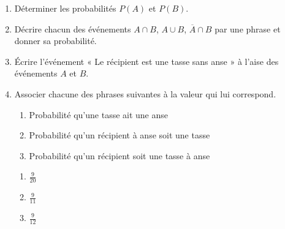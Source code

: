 \documentclass[11pt]{article}
\begin{document}
\begin{enumerate}
  \item Déterminer les probabilités $P(A)$ et $P(B)$.
  \item Décrire chacun des événements $A\cap B$, $A\cup B$, $\overline A\cap B$
    par une phrase et donner sa probabilité.
  \item Écrire l'événement « Le récipient est une tasse sans anse » à l'aise des
    événements $A$ et $B$.
  \item Associer chacune des phrases suivantes à la valeur qui lui correspond.\\
    \begin{minipage}[]{.6\textwidth}
      \begin{center}
        \begin{enumerate}
          \item Probabilité qu'une tasse ait une anse
          \item Probabilité qu'un récipient à anse soit une tasse
          \item Probabilité qu'un récipient soit une tasse à anse
        \end{enumerate}
      \end{center}
    \end{minipage}
    \hfill
    \begin{minipage}[]{.2\textwidth}
      \begin{center}
        \begin{enumerate}[label=(\arabic*)]
          \item $\frac{9}{20}$ 
          \item $\frac{9}{11}$ 
          \item $\frac{9}{12}$ 
        \end{enumerate}
      \end{center}
    \end{minipage}
\end{enumerate}
\end{document}
